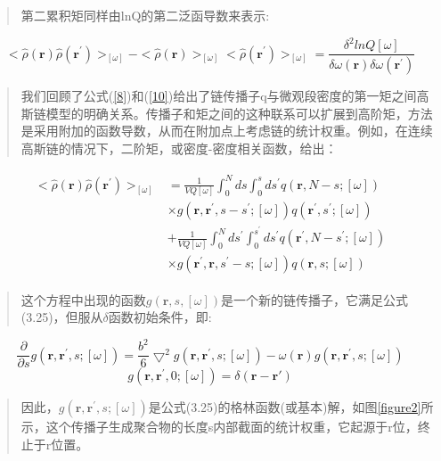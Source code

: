 \begin{quotation}
第二累积矩同样由lnQ的第二泛函导数来表示:
\end{quotation}
\begin{equation}\label{27}
<\hat{\rho}(\mathbf{r})\hat{\rho}(\mathbf{r}^{'})>_{[\omega]}-<\hat{\rho}(\mathbf{r})>_{[\omega]}<\hat{\rho}(\mathbf{r}^{'})>_{[\omega]}=\frac{\delta^2 lnQ[\omega]}{\delta\omega(\mathbf{r})\delta \omega(\mathbf{r}^{'})}
\end{equation}
\begin{quotation}
我们回顾了公式(\ref{8})和(\ref{10})给出了链传播子q与微观段密度的第一矩之间高斯链模型的明确关系。传播子和矩之间的这种联系可以扩展到高阶矩，方法是采用附加的函数导数，从而在附加点上考虑链的统计权重。例如，在连续高斯链的情况下，二阶矩，或密度-密度相关函数，给出：
\end{quotation}
\begin{align}\label{28}
\begin{split}
<\hat{\rho}(\mathbf{r})\hat{\rho}(\mathbf{r}^{'})>_{[\omega]}&=\frac{1}{VQ[\omega]}\int_{0}^{N}ds \int_{0}^{s}ds^{'}q(\mathbf{r},N-s;[\omega])\\&\times g(\mathbf{r},\mathbf{r}^{'},s-s^{'};[\omega])q(\mathbf{r}^{'},s^{'};[\omega])\\&+\frac{1}{VQ[\omega]}\int_{0}^{N}ds^{'} \int_{0}^{s^{'}}ds^{'}q(\mathbf{r}^{'},N-s^{'};[\omega])\\&\times g(\mathbf{r}^{'},\mathbf{r},s^{'}-s;[\omega])q(\mathbf{r},s;[\omega])
\end{split}
\end{align}
\begin{quotation}
这个方程中出现的函数$g(\mathbf{r},s,[\omega])$是一个新的链传播子，它满足公式(3.25)，但服从$\delta$函数初始条件，即:
\end{quotation}
\begin{equation}\label{29}
\frac{\partial}{\partial s}g(\mathbf{r},\mathbf{r}^{'},s;[\omega])=\frac{b^2}{6}\bigtriangledown^2g(\mathbf{r},\mathbf{r}^{'},s;[\omega])-\omega(\mathbf{r})g(\mathbf{r},\mathbf{r}^{'},s;[\omega])
\end{equation}
\begin{equation}\label{30}
g(\mathbf{r},\mathbf{r}^{'},0;[\omega])=\delta(\mathbf{r}-\mathbf{r}{'})
\end{equation}
\begin{quotation}
因此，$g(\mathbf{r},\mathbf{r}^{'},s;[\omega])$是公式(3.25)的格林函数(或基本)解，如图\ref{figure2}所示，这个传播子生成聚合物的长度s内部截面的统计权重，它起源于r位，终止于r位置。
\end{quotation}
